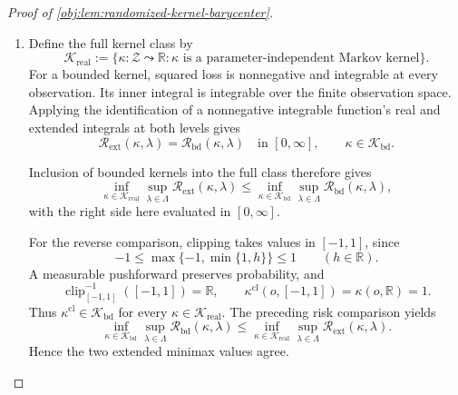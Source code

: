 \begin{proof}[Proof of \cref{obj:lem:randomized-kernel-barycenter}]
\begin{enumerate}
Define the clipped kernel by the pushforward
\[
\kappa^{\mathrm{cl}}(o,\cdot)
:=
\kappa(o,\cdot)\circ\operatorname{clip}_{[-1,1]}^{-1},
\qquad o\in\mathcal Z,
\]
and define the extended risk for any real-valued Markov kernel by
\[
\mathcal R_{\mathrm{ext}}(\kappa,\lambda)
:=
\int_{\mathcal Z}\int_{\mathbb R}
\bigl(h-\vartheta(\lambda)\bigr)^2\,\kappa(o,dh)\,Q_\lambda(do)
\in[0,\infty],
\]
where both integrals are nonnegative extended integrals. Clipping is measurable.
The pushforward integration formula and monotonicity of these integrals give
\[
\begin{aligned}
\mathcal R_{\mathrm{ext}}(\kappa^{\mathrm{cl}},\lambda)
&=
\int_{\mathcal Z}\int_{\mathbb R}
\bigl(\operatorname{clip}_{[-1,1]}(h)-\vartheta(\lambda)\bigr)^2
\,\kappa(o,dh)\,Q_\lambda(do)\\
&\le \mathcal R_{\mathrm{ext}}(\kappa,\lambda).
\end{aligned}
\]
This comparison includes infinite original risks. %

\item Define the full kernel class by
\[
\mathcal K_{\mathrm{real}}
:=
\{\kappa:\mathcal Z\leadsto\mathbb R:
\kappa\text{ is a parameter-independent Markov kernel}\}.
\]
For a bounded kernel, squared loss is nonnegative and integrable at every
observation. Its inner integral is integrable over the finite observation
space. Applying the identification of a nonnegative integrable function's real
and extended integrals at both levels gives
\[
\mathcal R_{\mathrm{ext}}(\kappa,\lambda)
=\mathcal R_{\mathrm{bd}}(\kappa,\lambda)
\quad\text{in }[0,\infty],
\qquad \kappa\in\mathcal K_{\mathrm{bd}}.
\]

Inclusion of bounded kernels into the full class therefore gives
\[
\inf_{\kappa\in\mathcal K_{\mathrm{real}}}
\sup_{\lambda\in\Lambda}\mathcal R_{\mathrm{ext}}(\kappa,\lambda)
\le
\inf_{\kappa\in\mathcal K_{\mathrm{bd}}}
\sup_{\lambda\in\Lambda}\mathcal R_{\mathrm{bd}}(\kappa,\lambda),
\]
with the right side here evaluated in \([0,\infty]\).

For the reverse comparison, clipping takes values in \([-1,1]\), since
\[
-1\le \max\{-1,\min\{1,h\}\}\le1
\qquad(h\in\mathbb R).
\]
A measurable pushforward preserves probability, and
\[
\operatorname{clip}_{[-1,1]}^{-1}([-1,1])=\mathbb R,
\qquad
\kappa^{\mathrm{cl}}(o,[-1,1])=\kappa(o,\mathbb R)=1.
\]
Thus \(\kappa^{\mathrm{cl}}\in\mathcal K_{\mathrm{bd}}\) for every
\(\kappa\in\mathcal K_{\mathrm{real}}\). The preceding risk comparison yields
\[
\inf_{\kappa\in\mathcal K_{\mathrm{bd}}}
\sup_{\lambda\in\Lambda}\mathcal R_{\mathrm{bd}}(\kappa,\lambda)
\le
\inf_{\kappa\in\mathcal K_{\mathrm{real}}}
\sup_{\lambda\in\Lambda}\mathcal R_{\mathrm{ext}}(\kappa,\lambda).
\]
Hence the two extended minimax values agree.


\end{enumerate}
\end{proof}
